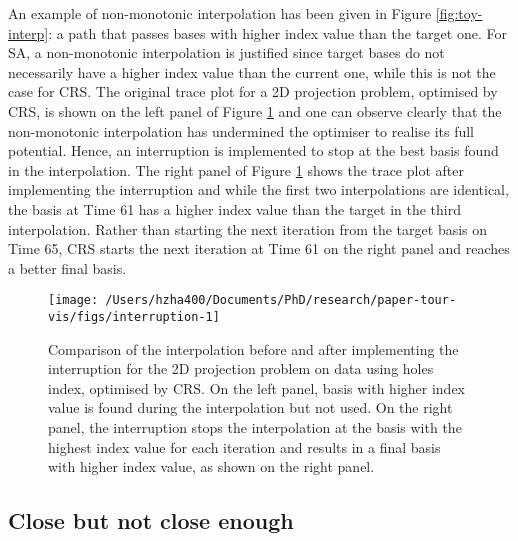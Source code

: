 An example of non-monotonic interpolation has been given in Figure
\ref{fig:toy-interp}: a path that passes bases with higher index value
than the target one. For SA, a non-monotonic interpolation is justified
since target bases do not necessarily have a higher index value than the
current one, while this is not the case for CRS. The original trace plot
for a 2D projection problem, optimised by CRS, is shown on the left
panel of Figure \ref{fig:interruption} and one can observe clearly that
the non-monotonic interpolation has undermined the optimiser to realise
its full potential. Hence, an interruption is implemented to stop at the
best basis found in the interpolation. The right panel of Figure
\ref{fig:interruption} shows the trace plot after implementing the
interruption and while the first two interpolations are identical, the
basis at Time 61 has a higher index value than the target in the third
interpolation. Rather than starting the next iteration from the target
basis on Time 65, CRS starts the next iteration at Time 61 on the right
panel and reaches a better final basis.

\begin{Schunk}
\begin{figure}

{\centering \texttt{[image: /Users/hzha400/Documents/PhD/research/paper-tour-vis/figs/interruption-1]} 

}

\caption[Comparison of the interpolation before and after implementing the interruption for the 2D projection problem on  data using holes index, optimised by CRS]{Comparison of the interpolation before and after implementing the interruption for the 2D projection problem on  data using holes index, optimised by CRS. On the left panel, basis with higher index value is found during the interpolation but not used. On the right panel, the interruption stops the interpolation at the basis with the highest index value for each iteration and results in a final basis with higher index value, as shown on the right panel.}\label{fig:interruption}
\end{figure}
\end{Schunk}

\hypertarget{close-but-not-close-enough}{%
\subsection{Close but not close
enough}\label{close-but-not-close-enough}}

